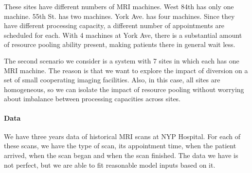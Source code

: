 These sites have different numbers of MRI machines. West 84th has
only one machine. 55th St. has two machines. York Ave. has four machines.
Since they have different processing capacity, a different number of
appointments are scheduled for each. With 4 machines at York Ave, there is a
substantial amount of resource pooling ability present, making
patients there in general wait less.

The second scenario we consider is a system with 7 sites in which each has one
MRI machine. The reason is that we want to explore the impact of
diversion on a set of small cooperating imaging facilities. Also,
in this case, all sites are homogeneous, so we can isolate
the impact of resource pooling without worrying about imbalance between
processing capacities across sites.

\paragraph{Data}
We have three years data of historical MRI scans at NYP Hospital.
For each of these scans, we have the type of scan, its appointment time, when
the patient arrived, when the scan began and when the scan finished. The data we have
is not perfect, but we are able to fit reasonable model inputs based on it.

